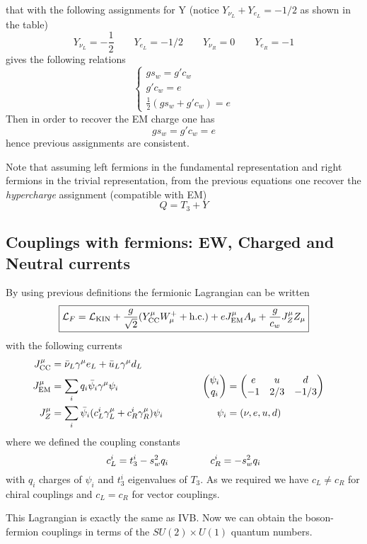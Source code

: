 \documentclass[TheoreticalPhy_ModB.tex]{subfiles}
\begin{document}
that with the following assignments for Y (notice $Y_{\nu_L}+Y_{e_L}=-1/2$ as shown in the table)
\[Y_{\nu_L}=-\frac12\qquad Y_{e_L}=-1/2\qquad Y_{\nu_R}=0\qquad Y_{e_R}=-1\]
gives the following relations
\[\begin{cases}
gs_w=g'c_w\\
g'c_w=e\\
\frac12(gs_w+g'c_w)=e
\end{cases}\]
Then in order to recover the EM charge one has
\[gs_w=g'c_w=e\]
hence previous assignments are consistent.  

Note that assuming left fermions in the fundamental representation and right fermions in the trivial representation, from the previous equations one recover the \emph{hypercharge} assignment (compatible with EM)
\[Q=T_3+Y\]

\subsection{Couplings with fermions: EW, Charged and Neutral currents}

By using previous definitions the fermionic Lagrangian can be written
\[\boxed{\mathcal L_F=\mathcal L_{\text{KIN}}+\frac g{\sqrt2}(Y_{\text{CC}}^\mu W_\mu^++\text{h.c.})+eJ_{\text{EM}}^\mu A_\mu+\frac g{c_w}J_Z^\mu Z_\mu}\]
with the following currents
\[\begin{aligned}
J_{\text{CC}}^\mu&=\bar\nu_L\gamma^\mu e_L+\bar u_L\gamma^\mu d_L\\
J_{\text{EM}}^\mu&=\sum_{i}q_i\bar\psi_i\gamma^\mu\psi_i&&&\begin{pmatrix}\psi_i\\q_i\end{pmatrix}&=\begin{pmatrix}e&u&d\\-1&2/3&-1/3\end{pmatrix}\\
J_Z^\mu&=\sum_i\bar\psi_i(c_L^i\gamma^\mu_L+c_R^i\gamma_R^\mu)\psi_i\hspace{0.7cm}&&&\psi_i&=(\nu,e,u,d)
\end{aligned}\]
where we defined the coupling constants
\[c_L^i=t_3^i-s_w^2q_i\hspace{1.5cm}c_R^i=-s_w^2q_i\]
with $q_i$ charges of $\psi_i$ and $t_3^i$ eigenvalues of $T_3$. As we required we have $c_L\neq c_R$ for chiral couplings and $c_L=c_R$ for vector couplings. 

This Lagrangian is exactly the same as IVB. Now we can obtain the boson-fermion couplings in terms of the $SU(2)\times U(1)$ quantum numbers. 
\end{document}
